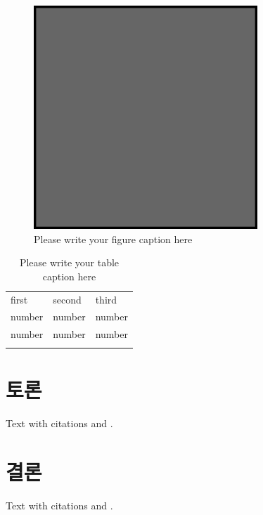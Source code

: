 \begin{figure}
  \includegraphics[width=0.75\textwidth]{example.eps}
\caption{Please write your figure caption here}
\label{fig:2}       %
\end{figure}
%
\begin{table}
\caption{Please write your table caption here}
\label{tab:1}       %
\begin{tabular}{lll}
\hline\noalign{\smallskip}
first & second & third  \\
\noalign{\smallskip}\hline\noalign{\smallskip}
number & number & number \\
number & number & number \\
\noalign{\smallskip}\hline
\end{tabular}
\end{table}

\section{토론}
\label{sec:2}
Text with citations \cite{RefB} and \cite{RefJ}.

\section{결론}
\label{sec:3}
Text with citations \cite{RefB} and \cite{RefJ}.


